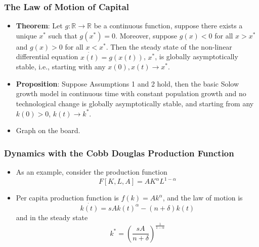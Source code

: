 \documentclass[11pt]{beamer}
\begin{document}

\begin{frame}
\frametitle{The Law of Motion of Capital}
\begin{itemize}\itemsep2ex
	\item \textbf{Theorem}: Let $g:\mathbb{R} \rightarrow \mathbb{R}$ be a continuous function, suppose there exists a unique $x^*$ such that $g(x^*)=0$. Moreover, suppose $g(x)<0$ for all $x>x^*$ and $g(x)>0$ for all $x<x^*$. Then the steady state of the non-linear differential equation $\dot{x(t)} = g(x(t))$, $x^*$,  is globally asymptotically stable, i.e., starting with any  $x(0), x(t) \rightarrow x^*$.
	\item \textbf{Proposition}: Suppose Assumptions 1 and 2 hold, then the basic Solow growth model in continuous time with constant population growth and no technological change is globally asymptotically stable, and starting from any  $k(0)>0$, $k(t) \rightarrow k^*$.
	\item Graph on the board.
\end{itemize}
\end{frame}


\begin{frame}
\frametitle{Dynamics with the Cobb Douglas Production Function}
\begin{itemize}\itemsep2ex
	\item As an example, consider the production function
\begin{equation*}
F[K,L,A] = A K^\alpha L^{1-\alpha}
\end{equation*}
	\item Per capita production function is $f(k)=Ak^\alpha$, and the law of motion is
\begin{equation*}
\dot{k(t)} = s A k(t)^\alpha - (n+\delta) k(t)
\end{equation*}
and in the steady state
\begin{equation*}
k^* = \left ( \frac{sA}{n+\delta} \right )^{\frac{1}{1-\alpha}}
\end{equation*}
\end{itemize}
\end{frame}

\end{document}

